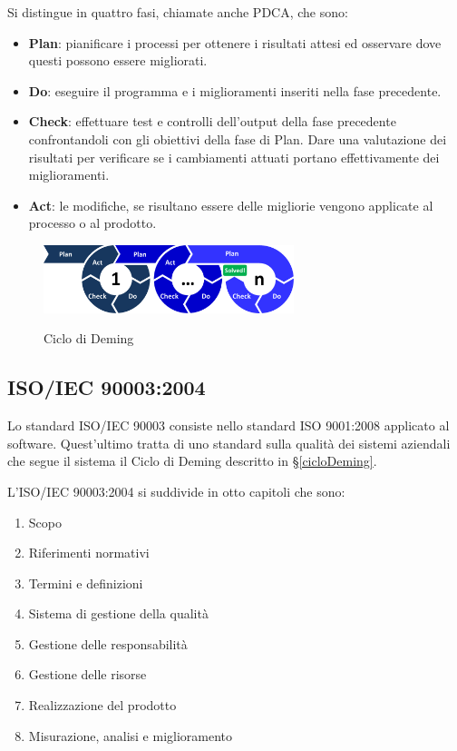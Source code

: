 	Si distingue in quattro fasi, chiamate anche PDCA, che sono:
	
	\begin{itemize}
		\item \textbf{Plan}: pianificare i processi per ottenere i risultati attesi ed osservare dove questi possono essere migliorati.
		\item \textbf{Do}: eseguire il programma e i miglioramenti inseriti nella fase precedente.
		\item \textbf{Check}: effettuare test e controlli dell'output della fase precedente confrontandoli con gli obiettivi della fase di Plan. Dare una valutazione dei risultati per verificare se i cambiamenti attuati portano effettivamente dei miglioramenti.
		\item \textbf{Act}: le modifiche, se risultano essere delle migliorie vengono applicate al processo o al prodotto.
	\end{itemize}

	\begin{figure}[H]
		\centering
		\includegraphics[width=0.65\textwidth]{img/PDCA}
		\label{fig:PDCA}
		\caption[Ciclo di Deming]{Ciclo di Deming\protect\footnotemark}
	\end{figure}


	\subsection{ISO/IEC 90003:2004}
	Lo standard ISO/IEC 90003 consiste nello standard ISO 9001:2008 applicato al software. Quest'ultimo tratta di uno standard sulla qualità dei sistemi aziendali che segue il sistema il Ciclo di Deming descritto in \S\ref{cicloDeming}.
	
	L'ISO/IEC 90003:2004 si suddivide in otto capitoli che sono:
	
	\begin{enumerate}
		\item Scopo
		\item Riferimenti normativi
		\item Termini e definizioni
		\item Sistema di gestione della qualità
		\item Gestione delle responsabilità
		\item Gestione delle risorse
		\item Realizzazione del prodotto
		\item Misurazione, analisi e miglioramento
	\end{enumerate}

